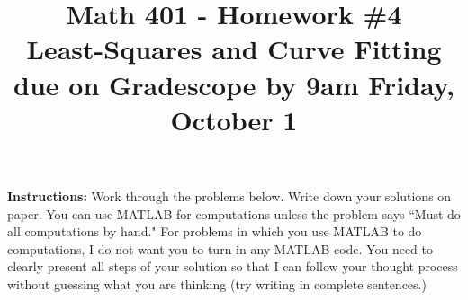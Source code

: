 \documentclass{article}
\newcommand{\0}{\mathbf{0}}
\begin{document}
\title{Math 401 - Homework \#4\\ Least-Squares and Curve Fitting\\ due on Gradescope by 9am Friday, October 1}
\author{}
\date{}
\maketitle

\noindent \textbf{Instructions:} Work through the problems below.  Write down your solutions on paper.  You can use MATLAB for computations unless the problem says ``Must do all computations by hand."  For problems in which you use MATLAB to do computations, I do not want you to turn in any MATLAB code.  You need to clearly present all steps of your solution so that I can follow your thought process without guessing what you are thinking (try writing in complete sentences.)
\end{document}
